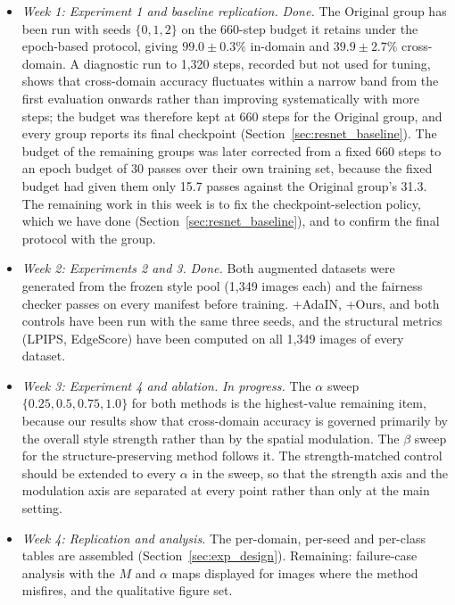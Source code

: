 \begin{itemize}
\item \textit{Week 1: Experiment 1 and baseline replication.} \textit{Done.} The Original group has been run with seeds $\{0,1,2\}$ on the 660-step budget it retains under the epoch-based protocol, giving $99.0\pm0.3\%$ in-domain and $39.9\pm2.7\%$ cross-domain. A diagnostic run to 1{,}320 steps, recorded but not used for tuning, shows that cross-domain accuracy fluctuates within a narrow band from the first evaluation onwards rather than improving systematically with more steps; the budget was therefore kept at 660 steps for the Original group, and every group reports its final checkpoint (Section~\ref{sec:resnet_baseline}). The budget of the remaining groups was later corrected from a fixed 660 steps to an epoch budget of 30 passes over their own training set, because the fixed budget had given them only 15.7 passes against the Original group's 31.3. The remaining work in this week is to fix the checkpoint-selection policy, which we have done (Section~\ref{sec:resnet_baseline}), and to confirm the final protocol with the group.
\item \textit{Week 2: Experiments 2 and 3.} \textit{Done.} Both augmented datasets were generated from the frozen style pool (1{,}349 images each) and the fairness checker passes on every manifest before training. +AdaIN, +Ours, and both controls have been run with the same three seeds, and the structural metrics (LPIPS, EdgeScore) have been computed on all 1{,}349 images of every dataset.
\item \textit{Week 3: Experiment 4 and ablation.} \textit{In progress.} The $\alpha$ sweep $\{0.25, 0.5, 0.75, 1.0\}$ for both methods is the highest-value remaining item, because our results show that cross-domain accuracy is governed primarily by the overall style strength rather than by the spatial modulation. The $\beta$ sweep for the structure-preserving method follows it. The strength-matched control should be extended to every $\alpha$ in the sweep, so that the strength axis and the modulation axis are separated at every point rather than only at the main setting.
\item \textit{Week 4: Replication and analysis.} The per-domain, per-seed and per-class tables are assembled (Section~\ref{sec:exp_design}). Remaining: failure-case analysis with the $M$ and $\alpha$ maps displayed for images where the method misfires, and the qualitative figure set.
\end{itemize}

